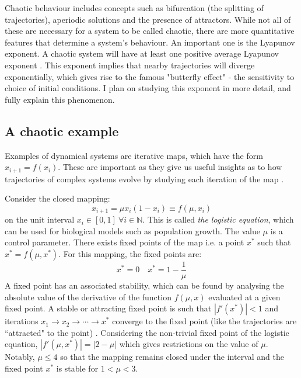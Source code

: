 \documentclass[12pt,a4paper]{amsart}
\begin{document}

Chaotic behaviour includes concepts such as bifurcation (the splitting of trajectories), aperiodic solutions and the presence of attractors. While not all of these are necessary for a system to be called chaotic, there are more quantitative features that determine a system's behaviour. An important one is the Lyapunov exponent. A chaotic system will have at least one positive average Lyapunov exponent \cite{HILBORN}. This exponent implies that nearby trajectories will diverge exponentially, which gives rise to the famous "butterfly effect" - the sensitivity to choice of initial conditions. I plan on studying this exponent in more detail, and fully explain this phenomenon.

\subsection{A chaotic example}

Examples of dynamical systems are iterative maps, which have the form $x_{i+1} = f(x_{i})$. These are important as they give us useful insights as to how trajectories of complex systems evolve by studying each iteration of the map \cite{HILBORN}.

Consider the closed mapping: $$x_{i+1} = {\mu} x_{i} (1 - x_{i}) \equiv f(\mu, x_{i}) \label{mapping}$$ on the unit interval $x_{i} \in [0, 1] \  {\forall}i \in \mathbb{N}$. This is called \textit{the logistic equation}, which can be used for biological models such as population growth. The value $\mu$ is a control parameter. There exists fixed points of the map i.e. a point $x^{*}$ such that $x^{*} = f(\mu, x^{*})$. For this mapping, the fixed points are: $$x^{*} = 0 \quad x^{*} = 1 - \frac{1}{\mu}$$ A fixed point has an associated stability, which can be found by analysing the absolute value of the derivative of the function $f(\mu, x)$ evaluated at a given fixed point. A stable or attracting fixed point is such that $|f'(x^{*})| < 1$ and iterations $x_{1} \rightarrow x_{2} \rightarrow \cdots \rightarrow x^{*}$ converge to the fixed point (like the trajectories are ``attracted" to the point) \cite{SCHECK}. Considering the non-trivial fixed point of the logistic equation, $|f'(\mu, x^{*})| = |2 - \mu|$ which gives restrictions on the value of $\mu$. Notably, $\mu \leq 4$ so that the mapping remains closed under the interval and the fixed point $x^{*}$ is stable for $1 < \mu < 3$. 
\end{document}
